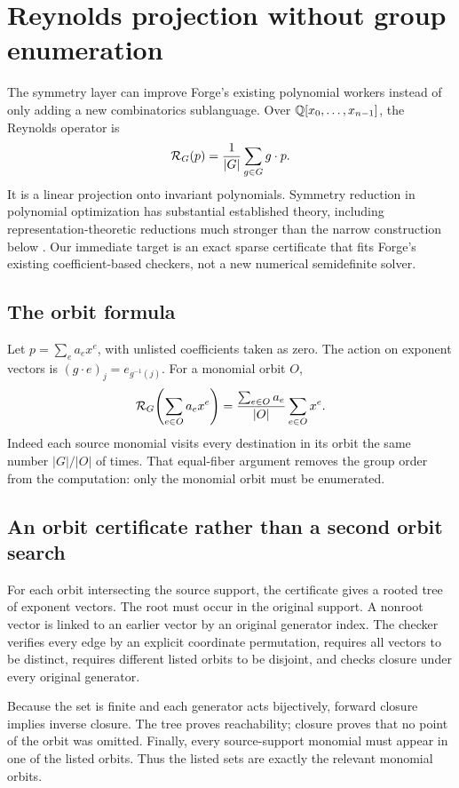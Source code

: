 \section{Reynolds projection without group enumeration}
\label{sec:reynolds}
The symmetry layer can improve Forge's existing polynomial workers instead of only adding a new combinatorics sublanguage. Over $\mathbb Q[x_0,\ldots,x_{n-1}]$, the Reynolds operator is
\[
  \mathcal R_G(p)=\frac1{|G|}\sum_{g\in G}g\cdot p.
\]
It is a linear projection onto invariant polynomials. Symmetry reduction in polynomial optimization has substantial established theory, including representation-theoretic reductions much stronger than the narrow construction below \cite{gatermann-parrilo}. Our immediate target is an exact sparse certificate that fits Forge's existing coefficient-based checkers, not a new numerical semidefinite solver.

\subsection{The orbit formula}
Let $p=\sum_e a_e x^e$, with unlisted coefficients taken as zero. The action on exponent vectors is $(g\cdot e)_j=e_{g^{-1}(j)}$. For a monomial orbit $O$,
\begin{equation}
  \mathcal R_G\!\left(\sum_{e\in O}a_ex^e\right)
  =\frac{\sum_{e\in O}a_e}{|O|}\sum_{e\in O}x^e.
  \label{eq:reynolds-orbit}
\end{equation}
Indeed each source monomial visits every destination in its orbit the same number $|G|/|O|$ of times. That equal-fiber argument removes the group order from the computation: only the monomial orbit must be enumerated.

\subsection{An orbit certificate rather than a second orbit search}
For each orbit intersecting the source support, the certificate gives a rooted tree of exponent vectors. The root must occur in the original support. A nonroot vector is linked to an earlier vector by an original generator index. The checker verifies every edge by an explicit coordinate permutation, requires all vectors to be distinct, requires different listed orbits to be disjoint, and checks closure under every original generator.

Because the set is finite and each generator acts bijectively, forward closure implies inverse closure. The tree proves reachability; closure proves that no point of the orbit was omitted. Finally, every source-support monomial must appear in one of the listed orbits. Thus the listed sets are exactly the relevant monomial orbits.

